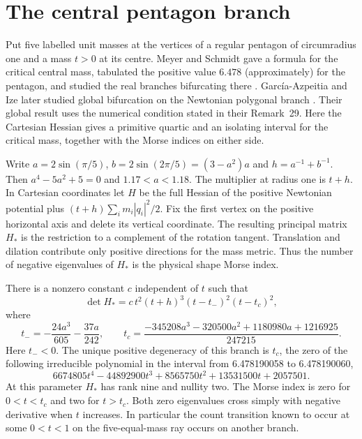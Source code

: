 \documentclass[11pt]{article}
\begin{document}
\section{The central pentagon branch}

Put five labelled unit masses at the vertices of a regular pentagon of
circumradius one and a mass $t>0$ at its centre. Meyer and Schmidt gave a formula for
the critical central mass, tabulated the positive value $6.478$ (approximately)
for the pentagon, and studied the real branches bifurcating there
\cite[Sec.~5 and Appendices~A--C]{MS}. Garc\'ia-Azpeitia and Ize later
studied global bifurcation on the Newtonian polygonal branch
\cite[Sec.~4.3, Prop.~28 and Thm.~30]{GI}. Their global result uses
the numerical condition stated in their Remark~29. Here the Cartesian
Hessian gives a primitive quartic and an isolating interval for the
critical mass, together with the Morse indices on either side.

Write $a=2\sin(\pi/5)$, $b=2\sin(2\pi/5)=(3-a^2)a$ and
$h=a^{-1}+b^{-1}$. Then $a^4-5a^2+5=0$ and $1.17<a<1.18$.
The multiplier at radius one is $t+h$.
In Cartesian coordinates let $H$ be the full Hessian of the positive
Newtonian potential plus $(t+h)\sum_i m_i|q_i|^2/2$. Fix the first
vertex on the positive horizontal axis and delete its vertical coordinate.
The resulting principal matrix $H_*$ is the restriction to a complement
of the rotation tangent. Translation and dilation contribute only positive
directions for the mass metric. Thus the number of negative eigenvalues
of $H_*$ is the physical shape Morse index.

There is a nonzero constant $c$ independent of $t$ such that
\[
 \det H_* = c\,t^2(t+h)^3(t-t_-)^2(t-t_c)^2,
\]
where
\[
 t_-=-\frac{24a^3}{605}-\frac{37a}{242},\qquad
 t_c=\frac{-345208a^3-320500a^2+1180980a+1216925}{247215}.
\]
Here $t_-<0$. The unique positive degeneracy of this branch is $t_c$,
the zero of the following irreducible polynomial in the interval from 6.478190058 to 6.478190060,
\[
 6674805t^4-44892900t^3+8565750t^2+13531500t+2057501 .
\]
At this parameter $H_*$ has rank nine and nullity two. The Morse index is
zero for $0<t<t_c$ and two for $t>t_c$. Both zero eigenvalues cross simply
with negative derivative when $t$ increases. In particular the count
transition known to occur at some $0<t<1$ on the five-equal-mass ray occurs
on another branch.
\end{document}
